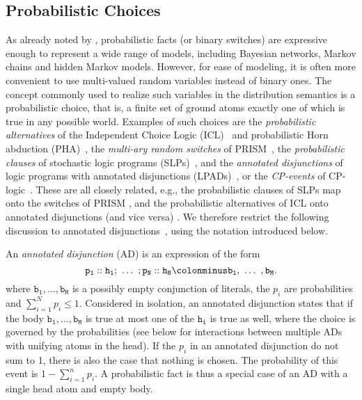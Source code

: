 \documentclass[a4paper]{article}
\begin{document}
\subsection{Probabilistic Choices}
\label{sec:ads}
As already noted by \cite{Sato:95}, probabilistic facts (or binary
switches) are expressive enough to represent a wide range of models,
including Bayesian networks, Markov chains and hidden Markov
models. However, for ease of modeling, it is often more convenient to
use multi-valued random variables instead of binary ones. The concept
commonly used to realize such variables in the distribution semantics
is a  probabilistic choice, that is, a finite 
set of ground atoms exactly one of which is true in any possible
world. 
Examples of such choices are the \emph{probabilistic alternatives} of the
Independent Choice Logic (ICL)~\citep{Poole00} and probabilistic Horn
abduction (PHA)~\citep{Poole:93}, the \emph{multi-ary random switches}
of PRISM~\citep{SatoKameya:01}, the \emph{probabilistic clauses} of
stochastic logic programs (SLPs)~\citep{Muggleton:96}, and the
\emph{annotated disjunctions} of logic programs with annotated
disjunctions (LPADs)~\citep{Vennekens04}, or the \emph{CP-events}
of CP-logic~\citep{Vennekens07}. These are all closely related, e.g.,
the probabilistic clauses of SLPs map onto the switches of PRISM
\citep{cussens:pr05}, and the probabilistic alternatives of ICL onto
annotated disjunctions (and vice versa) \citep{Vennekens04}. We
therefore  restrict the following discussion
to annotated disjunctions~\citep{Vennekens04}, using the notation
introduced below.

An \emph{annotated disjunction} (AD) is an expression of the form 
\begin{equation*}
\mathtt{p_1::h_1 ;\ \ldots\ ; p_N::h_N \colonminus b_1,\ \ldots\ ,b_M.}
\end{equation*}
where $\mathtt{b_1, \ldots , b_M}$ is a possibly empty
conjunction of literals, the $p_i$ are probabilities and $\sum_{i=1}^N
p_i\le1$. Considered in isolation, an annotated disjunction states that if the body $\mathtt{b_1,
\ldots , b_M}$ is true at most one of the $\mathtt{h_i}$ is true as
well, where
the choice is governed by the probabilities (see below for
interactions between multiple ADs with unifying atoms in the head). If the $p_i$ in an annotated disjunction
do not sum to 1, there is also the case that nothing is chosen. The
probability of this event is $1-\sum_{i=1}^n p_i$. A probabilistic
fact is thus a special case of an AD with a single head atom and empty
body. 
\end{document}
